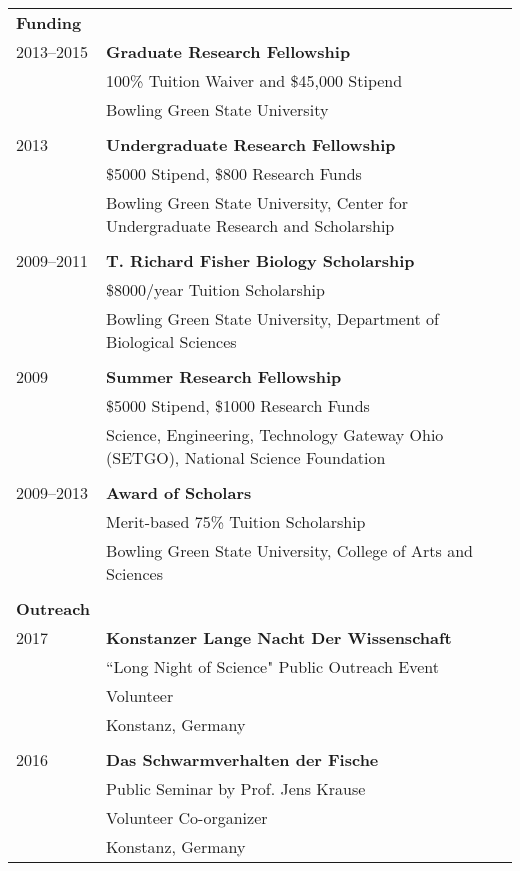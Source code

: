 \documentclass[letterpaper,7pt,oneside]{article}
\begin{document}
\begin{small}
\begin{longtable}{@{} l p{5.3in}l}
 \Large{\textbf{Funding}}  \vspace{5mm} \\
 \large{2013–2015}
     & \textbf{Graduate Research Fellowship} \\
     & 100\% Tuition Waiver and \$45,000 Stipend \\
     & Bowling Green State University \\
     & \\
 \large{2013}
& \textbf{Undergraduate Research Fellowship} \\
& \$5000 Stipend, \$800 Research Funds \\
& Bowling Green State University, Center for Undergraduate Research and Scholarship \\
& \\
 \large{2009–2011}
& \textbf{T. Richard Fisher Biology Scholarship} \\
& \$8000/year Tuition Scholarship \\
& Bowling Green State University, Department of Biological Sciences \\
& \\
 \large{2009}
& \textbf{Summer Research Fellowship} \\
& \$5000 Stipend, \$1000 Research Funds \\
& Science, Engineering, Technology Gateway Ohio (SETGO), National Science Foundation \\
& \\
 \large{2009–2013}
& \textbf{Award of Scholars} \\
& Merit-based 75\% Tuition Scholarship \\
& Bowling Green State University, College of Arts and Sciences \\
& \\
 \Large{\textbf{Outreach}}  \vspace{5mm} \\
\large{2017}
& \textbf{Konstanzer Lange Nacht Der Wissenschaft} \\
& ``Long Night of Science" Public Outreach Event \\
& Volunteer \\
& Konstanz, Germany \\
& \\
\large{2016}
& \textbf{Das Schwarmverhalten der Fische} \\
& Public Seminar by Prof. Jens Krause \\
& Volunteer Co-organizer \\
& Konstanz, Germany \\

\end{longtable}
\end{small}
\end{document}

